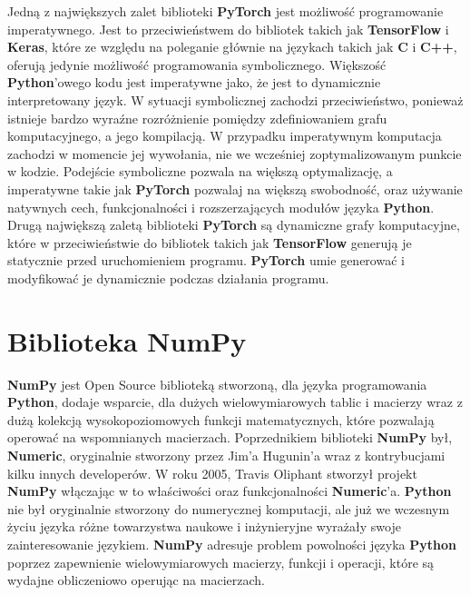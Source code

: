 Jedną z największych zalet biblioteki \textbf{PyTorch} jest możliwość programowanie imperatywnego. Jest to przeciwieństwem do bibliotek takich jak \textbf{TensorFlow} i \textbf{Keras}, które ze względu na poleganie głównie na językach takich jak \textbf{C} i \textbf{C++}, oferują jedynie możliwość programowania symbolicznego. Większość \textbf{Python}'owego kodu jest imperatywne jako, że jest to dynamicznie interpretowany język. W sytuacji symbolicznej zachodzi przeciwieństwo, ponieważ istnieje bardzo wyraźne rozróżnienie pomiędzy zdefiniowaniem grafu komputacyjnego, a jego kompilacją. W przypadku imperatywnym komputacja zachodzi w momencie jej wywołania, nie we wcześniej zoptymalizowanym punkcie w kodzie. Podejście symboliczne pozwala na większą optymalizację, a imperatywne takie jak \textbf{PyTorch} pozwalaj na większą swobodność, oraz używanie natywnych cech, funkcjonalności i rozszerzających modułów języka \textbf{Python}.
Drugą największą zaletą biblioteki \textbf{PyTorch} są dynamiczne grafy komputacyjne, które w przeciwieństwie do bibliotek takich jak \textbf{TensorFlow} generują je statycznie przed uruchomieniem programu. \textbf{PyTorch} umie generować i modyfikować je dynamicznie podczas działania programu.

\clearpage

\section{Biblioteka NumPy}
\textbf{NumPy} \cite{PythonForDataAnalysis} \cite{SciPyAndNumPy} \cite{NumPyManual} \cite{WikipediaNumPy} jest Open Source biblioteką stworzoną, dla języka programowania \textbf{Python}, dodaje wsparcie, dla dużych wielowymiarowych tablic i macierzy wraz z dużą kolekcją wysokopoziomowych funkcji matematycznych, które pozwalają operować na wspomnianych macierzach. Poprzednikiem biblioteki \textbf{NumPy} był, \textbf{Numeric}, oryginalnie stworzony przez Jim'a Hugunin'a wraz z kontrybucjami kilku innych developerów. W roku 2005, Travis Oliphant stworzył projekt \textbf{NumPy} włączając w to właściwości oraz funkcjonalności \textbf{Numeric}'a.
\textbf{Python} nie był oryginalnie stworzony do numerycznej komputacji, ale już we wczesnym życiu języka różne towarzystwa naukowe i inżynieryjne wyrażały swoje zainteresowanie językiem.
\textbf{NumPy} adresuje problem powolności języka \textbf{Python} poprzez zapewnienie wielowymiarowych macierzy, funkcji i operacji, które są wydajne obliczeniowo operując na macierzach.

